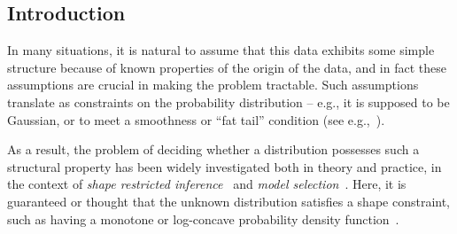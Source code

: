 \subsection{Introduction}\label{sec:introduction:shaperestrictions}
In many situations, it is natural to assume that this data exhibits some simple structure because of known properties of the origin of the data, and in fact these assumptions are crucial in making the problem tractable. Such assumptions translate as constraints on the probability distribution -- e.g., it is supposed to be Gaussian, or to meet a smoothness or ``fat tail'' condition (see e.g.,~\cite{Mandelbrot:63:FatTail,Hougaard:86:StableDistribs,PhysRevLett:95}).

As a result, the problem of deciding whether a distribution possesses such a structural property has been widely investigated both in theory and practice, in the context of \emph{shape restricted inference}~\cite{BBBB:72,SS:01} and \emph{model selection}~\cite{MP:03}. Here, it is guaranteed or thought that the unknown distribution satisfies a shape constraint, such as having a monotone or log-concave probability density function~\cite{SN:99,BB:05,Wal:09,Diakonikolas:CRC}.
%

